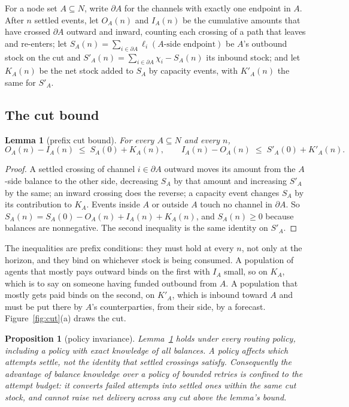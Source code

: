 \documentclass[11pt]{article}
\theoremstyle{plain}
\newtheorem{lemma}{Lemma}
\newtheorem{proposition}{Proposition}
\theoremstyle{definition}
\theoremstyle{remark}
\begin{document}
For a node set $A\subseteq N$, write $\partial A$ for the channels with exactly one endpoint in $A$. After $n$ settled events, let $O_A(n)$ and $I_A(n)$ be the cumulative amounts that have crossed $\partial A$ outward and inward, counting each crossing of a path that leaves and re-enters; let $S_A(n)=\sum_{i\in\partial A}\ell_i(\text{$A$-side endpoint})$ be $A$'s outbound stock on the cut and $S'_A(n)=\sum_{i\in\partial A}\chi_i-S_A(n)$ its inbound stock; and let $K_A(n)$ be the net stock added to $S_A$ by capacity events, with $K'_A(n)$ the same for $S'_A$.

\subsection{The cut bound}

\begin{lemma}[prefix cut bound]
\label{lem:cut}
For every $A\subseteq N$ and every $n$,
\[
O_A(n)-I_A(n)\;\le\;S_A(0)+K_A(n),
\qquad
I_A(n)-O_A(n)\;\le\;S'_A(0)+K'_A(n).
\]
\end{lemma}

\begin{proof}
A settled crossing of channel $i\in\partial A$ outward moves its amount from the $A$-side balance to the other side, decreasing $S_A$ by that amount and increasing $S'_A$ by the same; an inward crossing does the reverse; a capacity event changes $S_A$ by its contribution to $K_A$. Events inside $A$ or outside $A$ touch no channel in $\partial A$. So $S_A(n)=S_A(0)-O_A(n)+I_A(n)+K_A(n)$, and $S_A(n)\ge 0$ because balances are nonnegative. The second inequality is the same identity on $S'_A$.
\end{proof}

The inequalities are prefix conditions: they must hold at every $n$, not only at the horizon, and they bind on whichever stock is being consumed. A population of agents that mostly pays outward binds on the first with $I_A$ small, so on $K_A$, which is to say on someone having funded outbound from $A$. A population that mostly gets paid binds on the second, on $K'_A$, which is inbound toward $A$ and must be put there by $A$'s counterparties, from their side, by a forecast. Figure~\ref{fig:cut}(a) draws the cut.

\begin{proposition}[policy invariance]
\label{prop:invariance}
Lemma~\ref{lem:cut} holds under every routing policy, including a policy with exact knowledge of all balances. A policy affects which attempts settle, not the identity that settled crossings satisfy. Consequently the advantage of balance knowledge over a policy of bounded retries is confined to the attempt budget: it converts failed attempts into settled ones within the same cut stock, and cannot raise net delivery across any cut above the lemma's bound.
\end{proposition}
\end{document}
